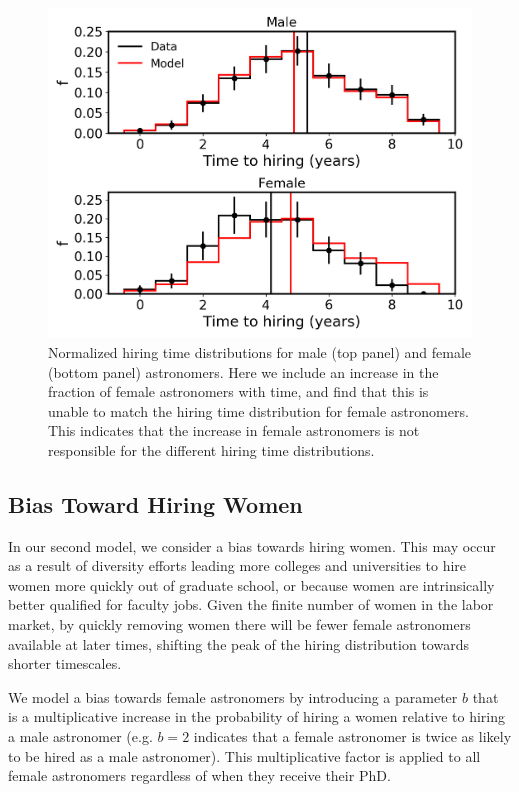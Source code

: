 \documentclass[modern]{aastex62}
\begin{document}
\begin{figure}[!hbt]
\center
\includegraphics[scale=.6]{model1.png}
\caption{Normalized hiring time distributions for male (top panel) and female (bottom panel) astronomers. Here we include an increase in the fraction of female astronomers with time, and find that this is unable to match the hiring time distribution for female astronomers. This indicates that the increase in female astronomers is not responsible for the different hiring time distributions. \label{model1}}
\end{figure}
 

\subsection{Bias Toward Hiring Women}
In our second model, we consider a bias towards hiring women. This may occur as a result of diversity efforts leading more colleges and universities to hire women more quickly out of graduate school, or because women are intrinsically better qualified for faculty jobs. Given the finite number of women in the labor market, by quickly removing women there will be fewer female astronomers available at later times, shifting the peak of the hiring distribution towards shorter timescales.

We model a bias towards female astronomers by introducing a parameter $b$ that is a multiplicative increase in the probability of hiring a women relative to hiring a male astronomer (e.g. $b=2$ indicates that a female astronomer is twice as likely to be hired as a male astronomer). This multiplicative factor is applied to all female astronomers regardless of when they receive their PhD. 
\end{document}
